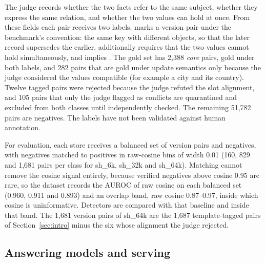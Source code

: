\documentclass[11pt]{article}
\newcommand{\code}[1]{\texttt{\detokenize{#1}}}          %
\newcommand{\sub}[1]{\textsf{sh\_#1}}                    %
\begin{document}
The judge records whether the two facts refer to the same subject, whether they express the same relation, and whether the two values can hold at once. From these fields each pair receives two labels. \code{gold_update} marks a version pair under the benchmark's convention: the same key with different objects, so that the later record supersedes the earlier. \code{gold_strict} additionally requires that the two values cannot hold simultaneously, and implies \code{gold_update}. The gold set has 2,388 \emph{core} pairs, gold under both labels, and 282 pairs that are gold under update semantics only because the judge considered the values compatible (for example a city and its country). Twelve tagged pairs were rejected because the judge refuted the slot alignment, and 105 pairs that only the judge flagged as conflicts are quarantined and excluded from both classes until independently checked. The remaining 51,782 pairs are negatives. The labels have not been validated against human annotation. %

For evaluation, each store receives a balanced set of version pairs and negatives, with negatives matched to positives in raw-cosine bins of width 0.01 (160, 829 and 1,681 pairs per class for \sub{6k}, \sub{32k} and \sub{64k}). Matching cannot remove the cosine signal entirely, because verified negatives above cosine 0.95 are rare, so the dataset records the AUROC of raw cosine on each balanced set (0.960, 0.911 and 0.893) and an overlap band, raw cosine 0.87--0.97, inside which cosine is uninformative. Detectors are compared with that baseline and inside that band. The 1,681 version pairs of \sub{64k} are the 1,687 template-tagged pairs of Section~\ref{sec:intro} minus the six whose alignment the judge rejected.

\subsection{Answering models and serving}
\label{sec:models}
\end{document}
